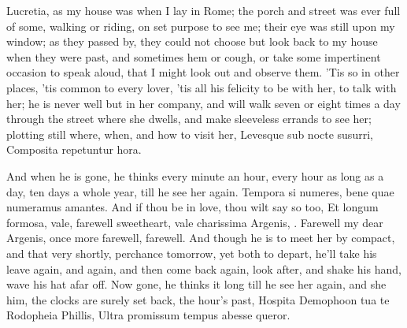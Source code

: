 Lucretia, as my house was when I lay in Rome; the porch and street was
ever full of some, walking or riding, on set purpose to see me; their
eye was still upon my window; as they passed by, they could not choose
but look back to my house when they were past, and sometimes hem or
cough, or take some impertinent occasion to speak aloud, that I might
look out and observe them. 'Tis so in other places, 'tis common to
every lover, 'tis all his felicity to be with her, to talk with her; he
is never well but in her company, and will walk  seven or eight
times a day through the street where she dwells, and make sleeveless
errands to see her; plotting still where, when, and how to visit her,
Levesque sub nocte susurri,
Composita repetuntur hora.

And when he is gone, he thinks every minute an hour, every hour as long
as a day, ten days a whole year, till he see her again. Tempora
si numeres, bene quae numeramus amantes. And if thou be in love, thou
wilt say so too, Et longum formosa, vale, farewell sweetheart, vale
charissima Argenis, \etc{}. Farewell my dear Argenis, once more farewell,
farewell. And though he is to meet her by compact, and that very
shortly, perchance tomorrow, yet both to depart, he'll take his leave
again, and again, and then come back again, look after, and shake his
hand, wave his hat afar off. Now gone, he thinks it long till he see
her again, and she him, the clocks are surely set back, the hour's
past,
Hospita Demophoon tua te Rodopheia Phillis,
Ultra promissum tempus abesse queror.

